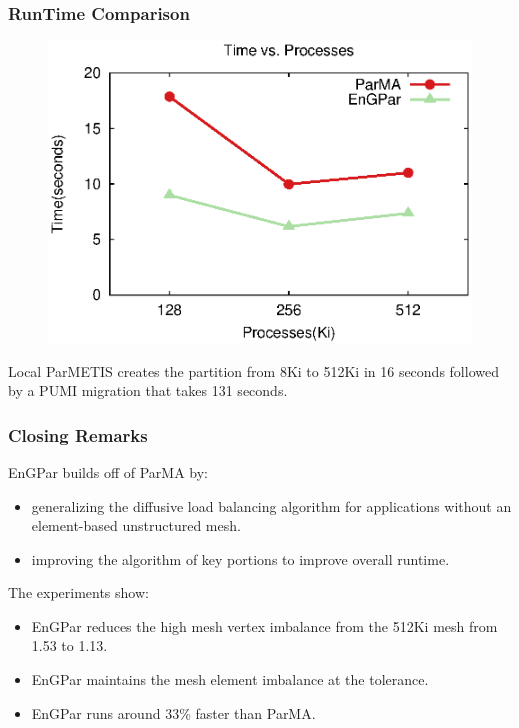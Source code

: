 \documentclass{beamer}
\begin{document}
\begin{frame}
  \frametitle{RunTime Comparison}
  \begin{figure}
    \centering
    \includegraphics[width=.7\textwidth]{figures/time_v_cores.eps}
  \end{figure}
  Local ParMETIS creates the partition from 8Ki to 512Ki in 16 seconds followed by a PUMI migration that takes 131 seconds.
  
\end{frame}

\begin{frame}
  \frametitle{Closing Remarks}
  EnGPar builds off of ParMA by:
  \begin {itemize}
  \item generalizing the diffusive load balancing algorithm for applications without an element-based unstructured mesh.
  \item improving the algorithm of key portions to improve overall runtime.
  \end{itemize}
  The experiments show:
  \begin {itemize}
  \item EnGPar reduces the high mesh vertex imbalance from the 512Ki mesh from 1.53 to 1.13.
  \item EnGPar maintains the mesh element imbalance at the tolerance.
  \item EnGPar runs around 33\% faster than ParMA.
  \end{itemize}
  
    
\end{frame}
\end{document}
